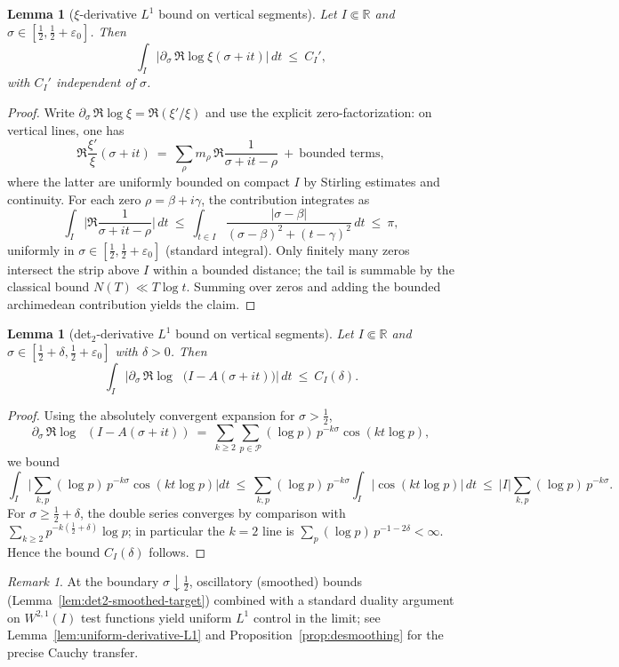 \documentclass[11pt]{article}
\newtheorem{lemma}[theorem]{Lemma}
\theoremstyle{definition}
\theoremstyle{remark}
\newtheorem{remark}[theorem]{Remark}
\newcommand{\R}{\mathbb{R}}
\newcommand{\PP}{\mathcal{P}}
\DeclareMathOperator{\dettwo}{det_2}
\begin{document}
\begin{lemma}[\(\xi\)-derivative $L^1$ bound on vertical segments]\label{lem:xi-deriv-L1}
Let $I\Subset\R$ and $\sigma\in[\tfrac12,\tfrac12+\varepsilon_0]$. Then
\[
 \int_I \Big|\partial_\sigma\,\Re\log\xi(\sigma+it)\Big|\,dt\ \le\ C_I',
\]
with $C_I'$ independent of $\sigma$.
\end{lemma}
\begin{proof}
Write \(\partial_\sigma\,\Re\log\xi=\Re(\xi'/\xi)\) and use the explicit zero-factorization: on vertical lines, one has
\[
 \Re\frac{\xi'}{\xi}(\sigma+it)\ =\ \sum_{\rho} m_\rho\,\Re\frac{1}{\sigma+it-\rho}\ +\ \text{bounded terms},
\]
where the latter are uniformly bounded on compact $I$ by Stirling estimates and continuity. For each zero \(\rho=\beta+i\gamma\), the contribution integrates as
\[\int_I \Big|\Re\frac{1}{\sigma+it-\rho}\Big|\,dt\ \le\ \int_{t\in I} \frac{|\sigma-\beta|}{(\sigma-\beta)^2+(t-\gamma)^2}\,dt\ \le\ \pi,
\]
uniformly in \(\sigma\in[\tfrac12,\tfrac12+\varepsilon_0]\) (standard integral). Only finitely many zeros intersect the strip above $I$ within a bounded distance; the tail is summable by the classical bound $N(T)\ll T\log t$. Summing over zeros and adding the bounded archimedean contribution yields the claim.
\end{proof}
\begin{lemma}[det$_2$-derivative $L^1$ bound on vertical segments]\label{lem:det2-deriv-L1}
Let $I\Subset\R$ and $\sigma\in[\tfrac12+\delta,\tfrac12+\varepsilon_0]$ with $\delta>0$. Then
\[
 \int_I \Big|\partial_\sigma\,\Re\log\dettwo\big(I-A(\sigma+it)\big)\Big|\,dt\ \le\ C_I(\delta).
\]
\end{lemma}
\begin{proof}
Using the absolutely convergent expansion for \(\sigma>\tfrac12\),
\[\partial_\sigma\,\Re\log\dettwo(I-A(\sigma+it))\ =\ \sum_{k\ge 2}\sum_{p\in\PP} (\log p)\,p^{-k\sigma}\cos(k t\log p),\]
we bound
\[\int_I \Big|\sum_{k,p}(\log p)\,p^{-k\sigma}\cos(k t\log p)\Big|dt\ \le\ \sum_{k,p}(\log p)\,p^{-k\sigma}\int_I |\cos(k t\log p)|\,dt\ \le\ |I|\sum_{k,p}(\log p)\,p^{-k\sigma}.
\]
For \(\sigma\ge \tfrac12+\delta\), the double series converges by comparison with \(\sum_{k\ge 2} p^{-k(\tfrac12+\delta)}\log p\); in particular the $k=2$ line is \(\sum_p (\log p)\,p^{-1-2\delta}<\infty\). Hence the bound $C_I(\delta)$ follows.
\end{proof}

\begin{remark}
At the boundary \(\sigma\downarrow \tfrac12\), oscillatory (smoothed) bounds (Lemma~\ref{lem:det2-smoothed-target}) combined with a standard duality argument on \(W^{2,1}(I)\) test functions yield uniform \(L^1\) control in the limit; see Lemma~\ref{lem:uniform-derivative-L1} and Proposition~\ref{prop:desmoothing} for the precise Cauchy transfer.
\end{remark}
\end{document}
